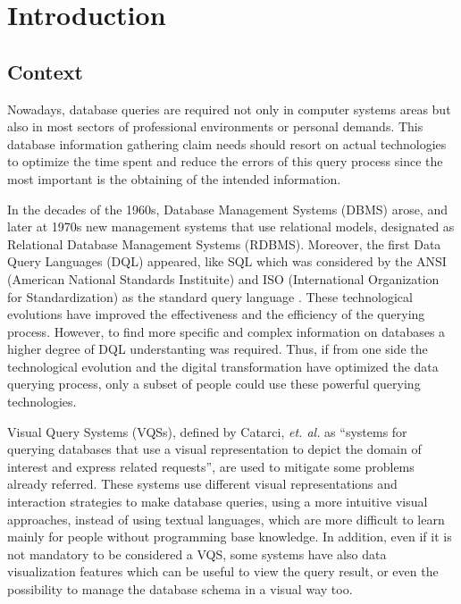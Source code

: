 \newcommand{\novathesis}{\emph{novathesis}}
\newcommand{\novathesisclass}{\texttt{novathesis.cls}}


\chapter{Introduction}
\label{cha:introduction}

\section{Context} 
\label{sec:context}
Nowadays, database queries are required not only in computer systems areas but also in most sectors of professional environments or personal demands. This database information gathering claim needs should resort on actual technologies to optimize the time spent and reduce the errors of this query process since the most important is the obtaining of the intended information.

In the decades of the 1960s, Database Management Systems (DBMS) arose, and later at 1970s new management systems that use relational models, designated as Relational Database Management Systems (RDBMS). Moreover, the first Data Query Languages (DQL) appeared, like SQL \cite{sequel_aStructuredEnglishQueryLanguage} which was considered by the ANSI (American National Standards Instituite) and ISO (International Organization for Standardization) as the standard query language \cite{databaseManagementSystems}. These technological evolutions have improved the effectiveness and the efficiency of the querying process. However, to find more specific and complex information on databases  a higher degree of DQL understanting was required. Thus, if from one side the technological evolution and the digital transformation have optimized the data querying process, only a subset of people could use these powerful querying technologies.

Visual Query Systems (VQSs), defined by Catarci, \textit{et. al.} \cite{visualQuerySystemsForDatabases_aSurvey} as “systems for querying databases that use a visual representation to depict the domain of interest and express related requests”, are used to mitigate some problems already referred. These systems use different visual representations and interaction strategies to make database queries, using a more intuitive visual approaches, instead of using textual languages, which are more difficult to learn mainly for people without programming base knowledge. In addition, even if it is not mandatory to be considered a VQS, some systems have also data visualization features which can be useful to view the query result, or even the possibility to manage the database schema in a visual way too.

